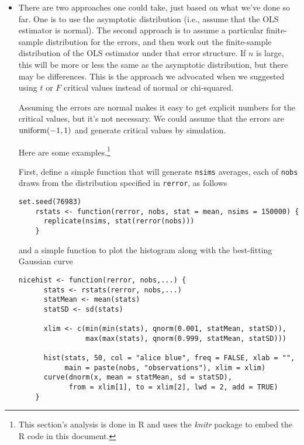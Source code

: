 \begin{itemize}[leftmargin=0pt]

\item There are two approaches one could take, just based on what
  we've done so far.  One is to use the asymptotic distribution (i.e.,
  assume that the OLS estimator is normal).  The second approach is to
  assume a particular finite-sample distribution for the errors, and
  then work out the finite-sample distribution of the OLS estimator
  under that error structure.  If $n$ is large, this will be more or
  less the same as the asymptotic distribution, but there may be
  differences.  This is the approach we advocated when we suggested
  using $t$ or $F$ critical values instead of normal or chi-squared.

  Assuming the errors are normal makes it easy to get explicit numbers
  for the critical values, but it's not necessary.  We could assume
  that the errors are $\operatorname{uniform}(-1,1)$ and generate critical values by
  simulation.

  Here are some examples.\footnote{This section's analysis is done in
    R \citep{R} and uses the \emph{knitr} package \citep{Xie13} to
    embed the R code in this document.}

  First, define a simple function that will generate \lstinline|nsims|
  averages, each of \lstinline|nobs| draws from the distribution
  specified in \lstinline|rerror|, as follows
  \begin{lstlisting}[firstline=2,gobble=4]
    set.seed(76983)
    rstats <- function(rerror, nobs, stat = mean, nsims = 150000) {
      replicate(nsims, stat(rerror(nobs)))
    }
  \end{lstlisting}
  and a simple function to plot the histogram along with the
  best-fitting Gaussian curve
  \begin{lstlisting}[gobble=4]
    nicehist <- function(rerror, nobs,...) {
      stats <- rstats(rerror, nobs,...)
      statMean <- mean(stats)
      statSD <- sd(stats)
  
      xlim <- c(min(min(stats), qnorm(0.001, statMean, statSD)),
                max(max(stats), qnorm(0.999, statMean, statSD)))

      hist(stats, 50, col = "alice blue", freq = FALSE, xlab = "",
           main = paste(nobs, "observations"), xlim = xlim)
      curve(dnorm(x, mean = statMean, sd = statSD),
            from = xlim[1], to = xlim[2], lwd = 2, add = TRUE)
    }
  \end{lstlisting}


\end{itemize}
